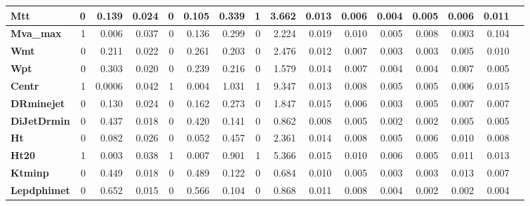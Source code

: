 \begin{sidewaystable}[htbp]
\begin{tabular}{|l|r|r|r|r|r|r|r|r|r|r|r|r|r|r|r|}
\textbf{Mtt} & 0 & 0.139 & 0.024 & 0 & 0.105 & 0.339 & 1 & 3.662 & 0.013 & 0.006 & 0.004 & 0.005 & 0.006 & 0.011 \\ \hline
\textbf{Mva\_max} & 1 & 0.006 & 0.037 & 0 & 0.136 & 0.299 & 0 & 2.224 & 0.019 & 0.010 & 0.005 & 0.008 & 0.003 & 0.104 \\ \hline
\textbf{Wmt} & 0 & 0.211 & 0.022 & 0 & 0.261 & 0.203 & 0 & 2.476 & 0.012 & 0.007 & 0.003 & 0.003 & 0.005 & 0.010 \\ \hline
\textbf{Wpt} & 0 & 0.303 & 0.020 & 0 & 0.239 & 0.216 & 0 & 1.579 & 0.014 & 0.007 & 0.004 & 0.004 & 0.007 & 0.005 \\ \hline
\textbf{Centr} & 1 & 0.0006 & 0.042 & 1 & 0.004 & 1.031 & 1 & 9.347 & 0.013 & 0.008 & 0.005 & 0.005 & 0.006 & 0.015 \\ \hline
\textbf{DRminejet} & 0 & 0.130 & 0.024 & 0 & 0.162 & 0.273 & 0 & 1.847 & 0.015 & 0.006 & 0.003 & 0.005 & 0.007 & 0.007 \\ \hline
\textbf{DiJetDrmin} & 0 & 0.437 & 0.018 & 0 & 0.420 & 0.141 & 0 & 0.862 & 0.008 & 0.005 & 0.002 & 0.002 & 0.005 & 0.005 \\ \hline
\textbf{Ht} & 0 & 0.082 & 0.026 & 0 & 0.052 & 0.457 & 0 & 2.361 & 0.014 & 0.008 & 0.005 & 0.006 & 0.010 & 0.008 \\ \hline
\textbf{Ht20} & 1 & 0.003 & 0.038 & 1 & 0.007 & 0.901 & 1 & 5.366 & 0.015 & 0.010 & 0.006 & 0.005 & 0.011 & 0.013 \\ \hline
\textbf{Ktminp} & 0 & 0.449 & 0.018 & 0 & 0.489 & 0.122 & 0 & 0.684 & 0.010 & 0.005 & 0.003 & 0.003 & 0.013 & 0.007 \\ \hline
\textbf{Lepdphimet} & 0 & 0.652 & 0.015 & 0 & 0.566 & 0.104 & 0 & 0.868 & 0.011 & 0.008 & 0.004 & 0.002 & 0.002 & 0.004 \\ \hline
\end{tabular}
\label{tab:muoYD4jetStats}
\end{sidewaystable}